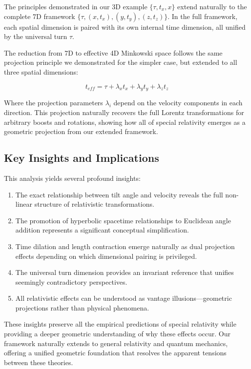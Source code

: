 \documentclass{article}
\begin{document}
The principles demonstrated in our 3D example $\{\tau, t_x, x\}$ extend naturally to the complete 7D framework $\{\tau, (x, t_x), (y, t_y), (z, t_z)\}$. In the full framework, each spatial dimension is paired with its own internal time dimension, all unified by the universal turn $\tau$.

The reduction from 7D to effective 4D Minkowski space follows the same projection principle we demonstrated for the simpler case, but extended to all three spatial dimensions:

\begin{equation}
t_{eff} = \tau + \lambda_x t_x + \lambda_y t_y + \lambda_z t_z
\end{equation}

Where the projection parameters $\lambda_i$ depend on the velocity components in each direction. This projection naturally recovers the full Lorentz transformations for arbitrary boosts and rotations, showing how all of special relativity emerges as a geometric projection from our extended framework.

\subsection{Key Insights and Implications}

This analysis yields several profound insights:

\begin{enumerate}
\item The exact relationship between tilt angle and velocity reveals the full non-linear structure of relativistic transformations.
\item The promotion of hyperbolic spacetime relationships to Euclidean angle addition represents a significant conceptual simplification.
\item Time dilation and length contraction emerge naturally as dual projection effects depending on which dimensional pairing is privileged.
\item The universal turn dimension provides an invariant reference that unifies seemingly contradictory perspectives.
\item All relativistic effects can be understood as vantage illusions---geometric projections rather than physical phenomena.
\end{enumerate}

These insights preserve all the empirical predictions of special relativity while providing a deeper geometric understanding of why these effects occur. Our framework naturally extends to general relativity and quantum mechanics, offering a unified geometric foundation that resolves the apparent tensions between these theories.
\end{document}
